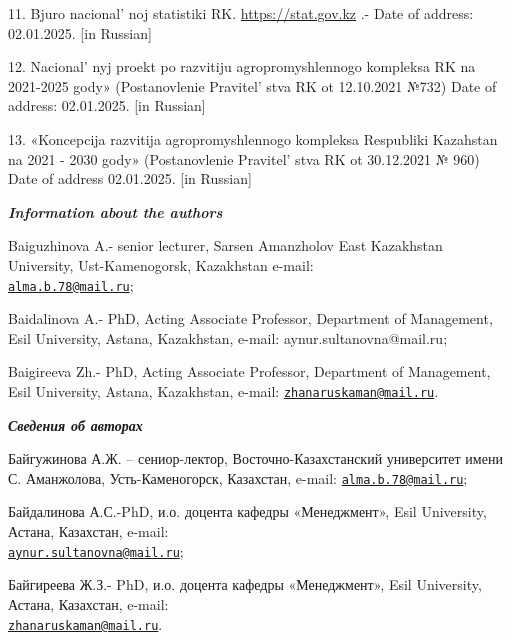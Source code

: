 \begin{references}
11. Bjuro nacional' noj statistiki RK.
\href{https://stat.gov.kz/en/}{https://stat.gov.kz} .- Date of address: 02.01.2025. {[}in Russian{]}

12. Nacional' nyj proekt po razvitiju agropromyshlennogo
kompleksa RK na 2021-2025 gody» (Postanov\-lenie
Pravitel' stva RK ot 12.10.2021 №732) Date of address:
02.01.2025. {[}in Russian{]}

13. «Koncepcija razvitija agropromyshlennogo kompleksa Respubliki
Kazahstan na 2021 - 2030 gody» (Postanovlenie
Pravitel' stva RK ot 30.12.2021 № 960) Date of address
02.01.2025. {[}in Russian{]}
\end{references}

\begin{authorinfo}
\emph{{\bfseries Information about the authors}}

Baiguzhinova A.- senior lecturer, Sarsen Amanzholov East Kazakhstan
University, Ust-Kamenogorsk, Kazakhstan e-mail:\\
\href{mailto:alma.b.78@mail.ru}{\nolinkurl{alma.b.78@mail.ru}};

Baidalinova A.- PhD, Acting Associate Professor, Department of
Management, Esil University, Astana, Kazakhstan, e-mail:
aynur.sultanovna@mail.ru;

Baigireeva Zh.- PhD, Acting Associate Professor, Department of
Management, Esil University, Astana, Kazakhstan, e-mail:
\href{mailto:zhanaruskaman@mail.ru}{\nolinkurl{zhanaruskaman@mail.ru}}.

\emph{{\bfseries Сведения об авторах}}

Байгужинова А.Ж. -- сениор-лектор, Восточно-Казахстанский университет
имени С. Аманжолова, Усть-Каменогорск, Казахстан, e-mail:
\href{mailto:alma.b.78@mail.ru}{\nolinkurl{alma.b.78@mail.ru}};

Байдалинова А.С.-PhD, и.о. доцента кафедры «Менеджмент», Esil
University, Астана, Казахстан, e-mail:\\
\href{mailto:aynur.sultanovna@mail.ru}{\nolinkurl{aynur.sultanovna@mail.ru}};

Байгиреева Ж.З.- PhD, и.о. доцента кафедры «Менеджмент», Esil
University, Астана, Казахстан, e-mail:\\
\href{mailto:zhanaruskaman@mail.ru}{\nolinkurl{zhanaruskaman@mail.ru}}.
\end{authorinfo}
